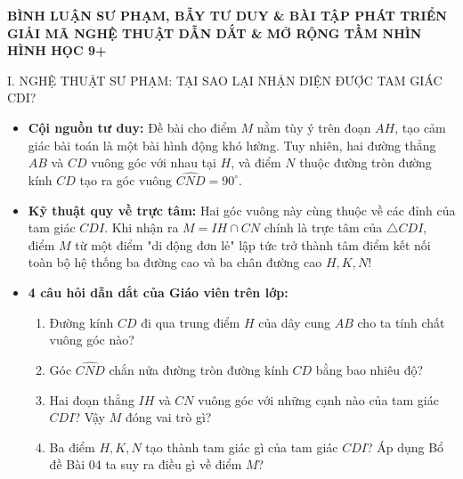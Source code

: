 \documentclass[11pt,a4paper]{article}
\begin{document}
\newpage

\begin{center}
    {\Large\bfseries\color{blue!80!black} BÌNH LUẬN SƯ PHẠM, BẪY TƯ DUY \& BÀI TẬP PHÁT TRIỂN}\\[1.5mm]
    {\large\bfseries GIẢI MÃ NGHỆ THUẬT DẪN DẮT \& MỞ RỘNG TẦM NHÌN HÌNH HỌC 9+}
\end{center}

\vspace{1mm}

\begin{pedagogybox}{I. NGHỆ THUẬT SƯ PHẠM: TẠI SAO LẠI NHẬN DIỆN ĐƯỢC TAM GIÁC CDI?}
\begin{itemize}[leftmargin=*]
    \item \textbf{Cội nguồn tư duy:} Đề bài cho điểm $M$ nằm tùy ý trên đoạn $AH$, tạo cảm giác bài toán là một bài hình động khó lường. Tuy nhiên, hai đường thẳng $AB$ và $CD$ vuông góc với nhau tại $H$, và điểm $N$ thuộc đường tròn đường kính $CD$ tạo ra góc vuông $\widehat{CND} = 90^\circ$.
    \item \textbf{Kỹ thuật quy về trực tâm:} Hai góc vuông này cùng thuộc về các đỉnh của tam giác $CDI$. Khi nhận ra $M = IH \cap CN$ chính là trực tâm của $\triangle CDI$, điểm $M$ từ một điểm "di động đơn lẻ" lập tức trở thành tâm điểm kết nối toàn bộ hệ thống ba đường cao và ba chân đường cao $H, K, N$!
    \item \textbf{4 câu hỏi dẫn dắt của Giáo viên trên lớp:}
    \begin{enumerate}[label=\arabic*., nosep]
        \item Đường kính $CD$ đi qua trung điểm $H$ của dây cung $AB$ cho ta tính chất vuông góc nào?
        \item Góc $\widehat{CND}$ chắn nửa đường tròn đường kính $CD$ bằng bao nhiêu độ?
        \item Hai đoạn thẳng $IH$ và $CN$ vuông góc với những cạnh nào của tam giác $CDI$? Vậy $M$ đóng vai trò gì?
        \item Ba điểm $H, K, N$ tạo thành tam giác gì của tam giác $CDI$? Áp dụng Bổ đề Bài 04 ta suy ra điều gì về điểm $M$?
    \end{enumerate}
\end{itemize}
\end{pedagogybox}

\vspace{1mm}
\end{document}
